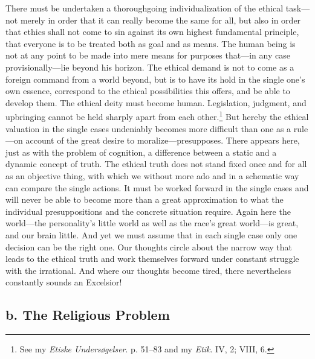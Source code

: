 \documentclass[12pt,a4paper]{book}
\newcommand{\opage}[1]{\marginnote{\footnotesize\textit{[#1]}}}
\begin{document}
There must be undertaken a thoroughgoing individualization of the ethical task---not merely in order that it can
really become the same for all, but also in order that ethics shall not come to sin against its own highest
fundamental principle, that everyone is to be treated both as goal \opage{369}and as means. The human being is not at any point
to be made into mere means for purposes that---in any case provisionally---lie beyond his horizon. The ethical demand
is not to come as a foreign command from a world beyond, but is to have its hold in the single one's own essence,
correspond to the ethical possibilities this offers, and be able to develop them. The ethical deity must become human.
Legislation, judgment, and upbringing cannot be held sharply apart from each other.\footnote{See my \emph{Etiske
Undersøgelser}. p. 51--83 and my \emph{Etik}. IV, 2; VIII, 6.} But hereby the ethical valuation in the single cases
undeniably becomes more difficult than one as a rule---on account of the great desire to moralize---presupposes. There
appears here, just as with the problem of cognition, a difference between a static and a dynamic concept of truth. The
ethical truth does not stand fixed once and for all as an objective thing, with which we without more ado and in a
schematic way can compare the single actions. It must be worked forward in the single cases and will never be able to
become more than a great approximation to what the individual presuppositions and the concrete situation require.
Again here the world---the personality's little world as well as the race's great world---is great, and our brain
little. And yet we must assume that in each single case only one decision can be the right one. Our thoughts circle
about the narrow way that leads to the ethical truth and work themselves forward under constant struggle with the
irrational. And where our thoughts become tired, there nevertheless constantly sounds an Excelsior!

\subsection*{b. The Religious Problem}
\end{document}
